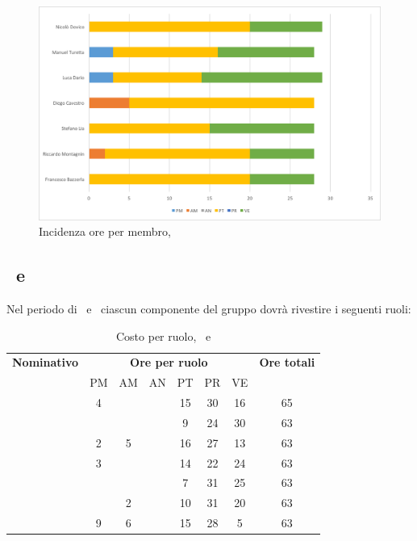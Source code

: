 \begin{figure}[H]
	\centering 
	\includegraphics[scale=0.7]{Immagini/GraficiPianoLavoro/PA.png}
	\caption{Incidenza ore per membro, \PA}
\end{figure}

\newpage
\subsection{\PD\ e \COD}
Nel periodo di \PD\ e \COD\ ciascun componente del gruppo dovrà rivestire i seguenti ruoli:

\begin{table}[h]
	\begin{center}
		\begin{tabular}{|c|c|c|c|c|c|c|c|}
			\hline
			\textbf{Nominativo} & \multicolumn{6}{c|}{\textbf{Ore per ruolo}} & \textbf{Ore totali} \\
					& PM & AM & AN & PT & PR & VE & \\
			\hline
			\FB		& 4  &	  &   & 15	&	30 & 16  &	65	\\
			\hline
			\RM		&	 &	  &	   & 9	&	24 & 30 & 63	\\
			\hline
			\SL		& 2	 & 5  &	   & 16	&	27 & 13  &	63	\\
			\hline
			\DC		& 3	 &	  &	   & 14	&	22 & 24 &	63	\\
			\hline
			\LD 	&	 &	  &	   & 7	&	31 & 25  &	63	\\
			\hline
			\MT		& 	 & 2  &	   & 10	&	31 & 20  &	63	\\
			\hline
			\ND 	& 9 & 6  &	   & 15	&	28 & 5 & 63	\\
			\hline
		\end{tabular}
	\end{center}
	\caption{Costo per ruolo, \PD\ e \COD}
\end{table}

